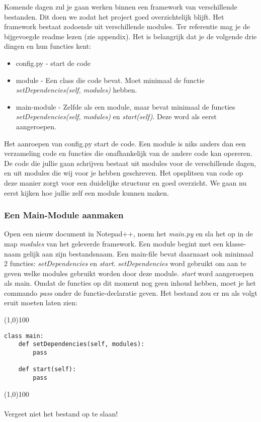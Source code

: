 \documentclass[a4paper]{article}
\begin{document}
Komende dagen zul je gaan werken binnen een framework van verschillende bestanden. Dit doen we zodat het project goed overzichtelijk blijft. Het framework bestaat zodoende uit verschillende modules. Ter referentie mag je de bijgevoegde readme lezen (zie appendix). Het is belangrijk dat je de volgende drie dingen en hun functies kent:
\begin{itemize}
\item config.py - start de code
\item module - Een class die code bevat. Moet minimaal de functie \textit{setDependencies(self, modules)} hebben.
\item main-module - Zelfde als een module, maar bevat minimaal de functies \textit{setDependencies(self, modules)} en \textit{start(self)}. Deze word als eerst aangeroepen.
\end{itemize}

Het aanroepen van config.py start de code. Een module is niks anders dan een verzameling code en functies die onafhankelijk van de andere code kan opereren. De code die jullie gaan schrijven bestaat uit modules voor de verschillende dagen, en uit modules die wij voor je hebben geschreven. Het opsplitsen van code op deze manier zorgt voor een duidelijke structuur en goed overzicht. We gaan nu eerst kijken hoe jullie zelf een module kunnen maken.

\subsubsection{Een Main-Module aanmaken}
Open een nieuw document in Notepad++, noem het \textit{main.py} en sla het op in de map \textit{modules} van het geleverde framework. 
Een module begint met een klasse-naam gelijk aan zijn bestandsnaam. Een main-file bevat daarnaast ook minimaal 2 functies: \textit{setDependencies} en \textit{start}. \textit{setDependencies} word gebruikt om aan te geven welke modules gebruikt worden door deze module. \textit{start} word aangeroepen als main.
Omdat de functies op dit moment nog geen inhoud hebben, moet je het commando \textit{pass} onder de functie-declaratie geven. Het bestand zou er nu als volgt eruit moeten laten zien:

\noindent \line(1,0){100}
\begin{verbatim}
class main:
    def setDependencies(self, modules):
        pass

    def start(self):
        pass
\end{verbatim}
\noindent \line(1,0){100}
\\\\
Vergeet niet het bestand op te slaan!
\end{document}
